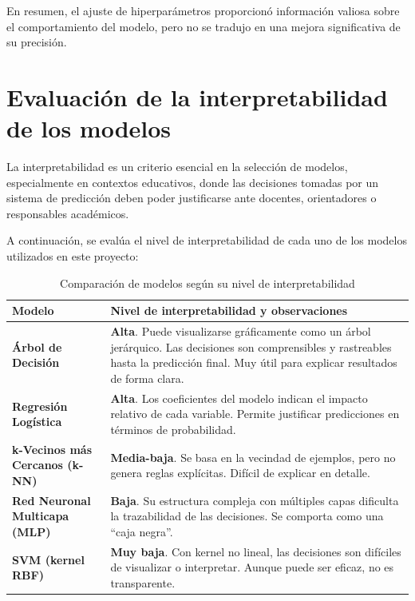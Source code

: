 \documentclass[11pt,a4paper]{article}
\begin{document}
\medskip

En resumen, el ajuste de hiperparámetros proporcionó información valiosa sobre el comportamiento del modelo, pero no se tradujo en una mejora significativa de su precisión.


\section{Evaluación de la interpretabilidad de los modelos}

La interpretabilidad es un criterio esencial en la selección de modelos, especialmente en contextos educativos, donde las decisiones tomadas por un sistema de predicción deben poder justificarse ante docentes, orientadores o responsables académicos.

A continuación, se evalúa el nivel de interpretabilidad de cada uno de los modelos utilizados en este proyecto:

\begin{table}[H]
\centering
\small
\begin{tabular}{lp{10cm}}
\toprule
\textbf{Modelo} & \textbf{Nivel de interpretabilidad y observaciones} \\
\midrule
\textbf{Árbol de Decisión} & \textbf{Alta}. Puede visualizarse gráficamente como un árbol jerárquico. Las decisiones son comprensibles y rastreables hasta la predicción final. Muy útil para explicar resultados de forma clara. \\
\textbf{Regresión Logística} & \textbf{Alta}. Los coeficientes del modelo indican el impacto relativo de cada variable. Permite justificar predicciones en términos de probabilidad. \\
\textbf{k-Vecinos más Cercanos (k-NN)} & \textbf{Media-baja}. Se basa en la vecindad de ejemplos, pero no genera reglas explícitas. Difícil de explicar en detalle. \\
\textbf{Red Neuronal Multicapa (MLP)} & \textbf{Baja}. Su estructura compleja con múltiples capas dificulta la trazabilidad de las decisiones. Se comporta como una “caja negra”. \\
\textbf{SVM (kernel RBF)} & \textbf{Muy baja}. Con kernel no lineal, las decisiones son difíciles de visualizar o interpretar. Aunque puede ser eficaz, no es transparente. \\
\bottomrule
\end{tabular}
\caption*{Comparación de modelos según su nivel de interpretabilidad}
\end{table}
\end{document}
